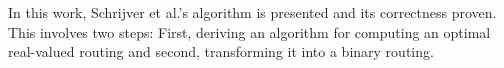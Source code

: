 In this work, Schrijver et al.'s algorithm is presented and its correctness proven.
This involves two steps: First, deriving an algorithm for computing an optimal real-valued routing and second, transforming it into a binary routing.

